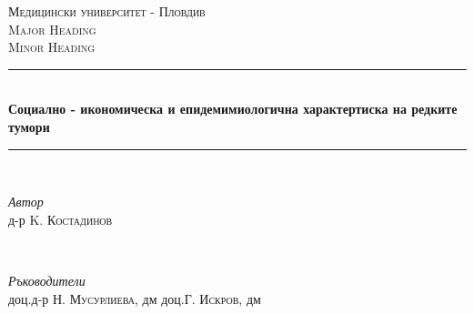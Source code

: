 %
%
%
% 

\newcommand{\HRule}{\rule{\linewidth}{0.5mm}} %
\center %
\textsc{\LARGE Медицински университет - Пловдив}\\[1.5cm] %
\textsc{\Large Major Heading}\\[0.5cm] %
\textsc{\large Minor Heading}\\[0.5cm] %
\HRule\\[0.8cm]
{\huge\bfseries Социално - икономическа и епидемимиологична характертиска на редките тумори}\\[0.4cm] %
\HRule\\[1.5cm]
\begin{minipage}{0.4\textwidth}
\begin{flushleft}
\large
\textit{Автор}\\
д-р K. \textsc{Костадинов} %
\end{flushleft}
\end{minipage}
~
\begin{minipage}{0.4\textwidth}
\begin{flushright}
\large
\textit{Ръководители}\\
доц.д-р Н. \textsc{Мусурлиева}, дм %
доц.Г.  \textsc{Искров}, дм %
\end{flushright}
\end{minipage}


